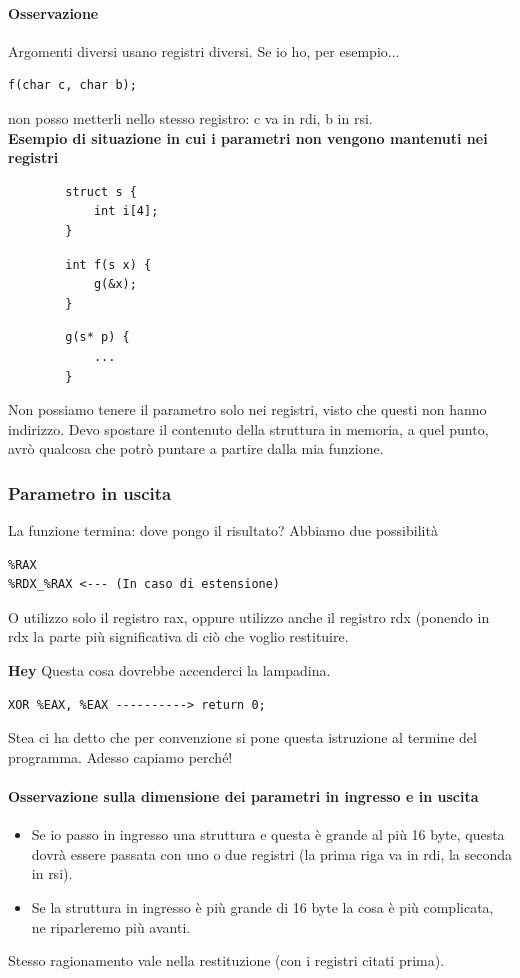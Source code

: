 \documentclass[11pt]{report}
\theoremstyle{definition}
\begin{document}
\paragraph{Osservazione} Argomenti diversi usano registri diversi. Se io ho, per esempio... 
\begin{verbatim}
f(char c, char b);
\end{verbatim}
non posso metterli nello stesso registro: c va in rdi, b in rsi.\\

\noindent \textbf{Esempio di situazione in cui i parametri non vengono mantenuti nei registri}

\begin{multicols}{3}
	\begin{verbatim}
		struct s {
			int i[4];
		}
	\end{verbatim}
	\begin{verbatim}
		int f(s x) {
			g(&x);
		}
	\end{verbatim}
	\begin{verbatim}
		g(s* p) {
			...
		}
	\end{verbatim}
\end{multicols}
\noindent Non possiamo tenere il parametro solo nei registri, visto che questi non hanno indirizzo. Devo spostare il contenuto della struttura in memoria, a quel punto, avrò qualcosa che potrò puntare a partire dalla mia funzione.

\subsubsection{Parametro in uscita} La funzione termina: dove pongo il risultato? Abbiamo due possibilità
\begin{verbatim}
%RAX
%RDX_%RAX <--- (In caso di estensione)
\end{verbatim} 
O utilizzo solo il registro rax, oppure utilizzo anche il registro rdx (ponendo in rdx la parte più significativa di ciò che voglio restituire.\\
\scriptsize

\noindent \textbf{Hey} Questa cosa dovrebbe accenderci la lampadina.
\begin{verbatim}
XOR %EAX, %EAX ----------> return 0;
\end{verbatim}
Stea ci ha detto che per convenzione si pone questa istruzione al termine del programma. Adesso capiamo perché!
\normalsize
\paragraph{Osservazione sulla dimensione dei parametri in ingresso e in uscita} 
\begin{itemize}
\item Se io passo in ingresso una struttura e questa è grande al più 16 byte, questa dovrà essere passata con uno o due registri (la prima riga va in rdi, la seconda in rsi). 
\item Se la struttura in ingresso è più grande di 16 byte la cosa è più complicata, ne riparleremo più avanti. 
\end{itemize}
Stesso ragionamento vale nella restituzione (con i registri citati prima).
\end{document}

